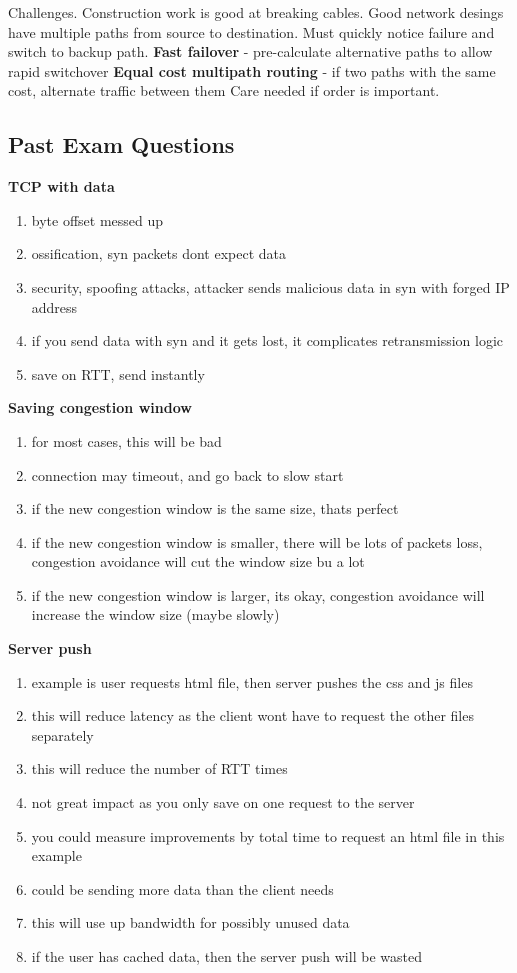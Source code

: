 \documentclass{article}
\begin{document}
Challenges. Construction work is good at breaking cables. Good network desings have multiple paths from source to destination.
Must quickly notice failure and switch to backup path.
\textbf{Fast failover} {-} pre-calculate alternative paths to allow rapid switchover
\textbf{Equal cost multipath routing} {-} if two paths with the same cost, alternate traffic between them
Care needed if order is important.

\clearpage

\subsection*{Past Exam Questions}

\textbf{TCP with data}

\begin{enumerate}
    \item byte offset messed up
    \item ossification, syn packets dont expect data
    \item security, spoofing attacks, attacker sends malicious data in syn with forged IP address
    \item if you send data with syn and it gets lost, it complicates retransmission logic
    \item save on RTT, send instantly
\end{enumerate}


\textbf{Saving congestion window}
\begin{enumerate}
    \item for most cases, this will be bad
    \item connection may timeout, and go back to slow start
    \item if the new congestion window is the same size, thats perfect
    \item if the new congestion window is smaller, there will be lots of packets loss, congestion avoidance will cut the window size bu a lot
    \item if the new congestion window is larger, its okay, congestion avoidance will increase the window size (maybe slowly)
\end{enumerate}


\textbf{Server push}
\begin{enumerate}
    \item example is user requests html file, then server pushes the css and js files
    \item this will reduce latency as the client wont have to request the other files separately
    \item this will reduce the number of RTT times
    \item not great impact as you only save on one request to the server
    \item you could measure improvements by total time to request an html file in this example
    \item could be sending more data than the client needs
    \item this will use up bandwidth for possibly unused data
    \item if the user has cached data, then the server push will be wasted
\end{enumerate}
\end{document}
